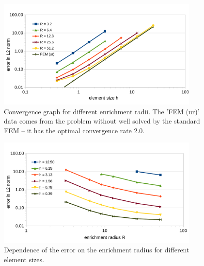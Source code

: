 \documentclass{elsarticle}
\newcommand{\figpath}{../graphics/}
\begin{document}
\begin{figure}[!htb]
  \centering    
  \includegraphics[width=0.9\textwidth]{results/radius_conv_1.pdf}
  \caption[Enrichment radius choice.]{Convergence graph for different enrichment radii. The 'FEM (ur)'
  data comes from the problem without well solved by the standard FEM -- it has the optimal convergence rate 2.0.}
  \label{fig:radius_conv_1}
\end{figure}
\begin{figure}[!htb]
  \centering    
  \includegraphics[width=0.9\textwidth]{results/radius_conv_2.pdf}
  \caption[Enrichment radius choice.]{Dependence of the error on the enrichment radius for different
  element sizes.}
  \label{fig:radius_conv_2}
\end{figure}
\end{document}
